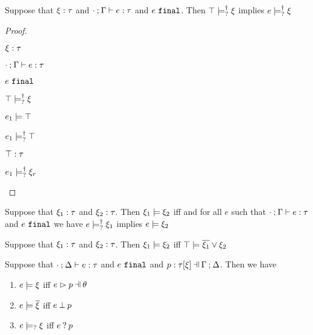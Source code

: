 \begin{corol}
  \label{corol:nn-exhaust}
  Suppose that $\xi : \tau$ and $\cdot \mathbin{;} \Gamma \vdash e : \tau$ and $e ~\mathtt{final}$. Then $\top \models_{?}^{\dag} \xi$ implies $e \models_{?}^{\dag} \xi$
\end{corol}
\begin{proof}
  \begin{pfsteps*}
  \item $\xi : \tau$  
  \item $\cdot \mathbin{;} \Gamma \vdash e : \tau$  
  \item $e ~\mathtt{final}$  
  \item $\top \models_{?}^{\dag} \xi$  
  \item $e_1 \models \top$  
  \item $e_1 \models_{?}^{\dag} \top$  
  \item $\top : \tau$  
  \item $e_1 \models_{?}^{\dag} \xi_r$ 
  \end{pfsteps*}
  \resetpfcounter
\end{proof}

\begin{defn}
  \label{defn:const-entailment}
  Suppose that $\xi_1 : \tau$ and $\xi_2 : \tau$.
  Then $\xi_1 \models \xi_2$ iff and for all $e$ such that $\cdot \mathbin{;} \Gamma \vdash e : \tau$ and $e ~\mathtt{final}$ we have $e \models_{?}^{\dag} \xi_1$ implies $e \models \xi_2$
\end{defn}
\begin{corol}
  \label{lem:material-entailment}
  Suppose that $\xi_1 : \tau$ and $\xi_2 : \tau$. Then $\xi_1 \models \xi_2$ iff $\top \models \overline{\xi_1} \vee \xi_2$
\end{corol}

\begin{lem}
  \label{lem:const-matching-coherence}
  Suppose that $\cdot \mathbin{;} \Delta \vdash e : \tau$ and $e ~\mathtt{final}$ and $\chpattyp{p}{\tau}{\xi}{\Gamma}{\Delta}$. Then we have
  \begin{enumerate}
    \item $e \models \xi$ iff $\hpatmatch{e}{p}{\theta}$
    \item $e \models \overline{\xi}$ iff $e \mathbin{\bot} p$
    \item $e \models_{?} \xi$ iff $e \mathbin{?} p$
  \end{enumerate}
\end{lem}

